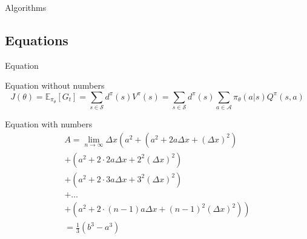 \documentclass{libs/XJTLU_format}
\begin{document}
\begin{frame}{Algorithms}
    \lstset{language=Python}
    
\end{frame}

\subsection{Equations}

\begin{frame}{Equation}
    \begin{block}{Equation without numbers} 
        \begin{equation*}
            J(\theta) = \mathbb{E}_{\pi_\theta}[G_t] = \sum_{s\in\mathcal{S}} d^\pi (s)V^\pi(s)=\sum_{s\in\mathcal{S}} d^\pi(s)\sum_{a\in\mathcal{A}}\pi_\theta(a|s)Q^\pi(s,a)
        \end{equation*}
    \end{block}
%       
\end{frame}

\begin{frame}
    \begin{block}{Equation with numbers}
        \begin{multline}
            A=\lim_{n\rightarrow\infty}\Delta x\left(a^{2}+\left(a^{2}+2a\Delta x+\left(\Delta x\right)^{2}\right)\right.\label{eq:reset}\\
            +\left(a^{2}+2\cdot2a\Delta x+2^{2}\left(\Delta x\right)^{2}\right)\\
            +\left(a^{2}+2\cdot3a\Delta x+3^{2}\left(\Delta x\right)^{2}\right)\\
            +\ldots\\
            \left.+\left(a^{2}+2\cdot(n-1)a\Delta x+(n-1)^{2}\left(\Delta x\right)^{2}\right)\right)\\
            =\frac{1}{3}\left(b^{3}-a^{3}\right)
        \end{multline}
    \end{block}
\end{frame}
\end{document}

